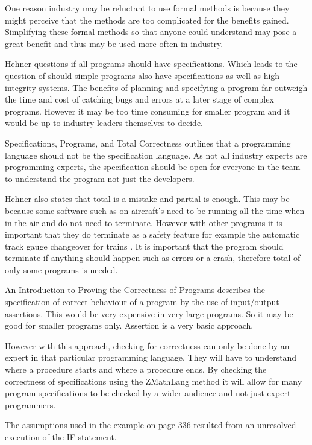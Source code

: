 One reason industry may be reluctant to use formal methods is because they might perceive that the methods are too complicated for the benefits gained. Simplifying these formal methods so that anyone could understand may pose a great benefit and thus may be used more often in industry.

Hehner questions if all programs should have specifications. Which leads to the question of should simple programs also have specifications as well as high integrity systems. The benefits of planning and specifying a program far outweigh the time and cost of catching bugs and errors at a later stage \cite{planning} of complex programs. However it may be too time consuming for smaller program and it would be up to industry leaders themselves to decide.

Specifications, Programs, and Total Correctness \cite{hehner99} outlines that a programming language should not be the specification language. As not all industry experts are programming experts, the specification should be open for everyone in the team to understand the program not just the developers.

Hehner also states that \gls{total} is a mistake and \gls{partial} is enough. This may be because some software such as on aircraft's need to be running all the time when in the air and do not need to terminate. However with other programs it is important that they do terminate as a safety feature for example the automatic track gauge changeover for trains \cite{automatictrain}. It is important that the program should terminate if anything should happen such as errors or a crash, therefore \gls{total} of only some programs is needed.

An Introduction to Proving the Correctness of Programs \cite{hantler} describes the specification of correct behaviour of a program by the use of input/output assertions. This would be very expensive in very large programs. So it may be good for smaller programs only. Assertion is a very basic approach.

However with this approach, checking for correctness can only be done by an expert in that particular programming language. They will have to understand where a procedure starts and where a procedure ends. By checking the correctness of specifications using the ZMathLang method it will allow for many program specifications to be checked by a wider audience and not just expert programmers.

The assumptions used in the example on page 336 \cite{hantler} resulted from an unresolved execution of the IF statement.

